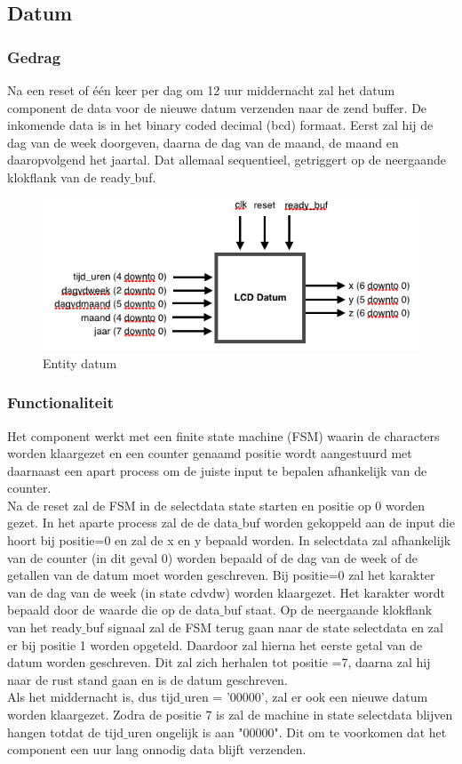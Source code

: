 \subsection{Datum}
\subsubsection{Gedrag}
Na een reset of \'e\'en keer per dag om 12 uur middernacht zal het datum component de data voor de nieuwe datum verzenden naar de zend buffer. De inkomende data is in het binary coded decimal (bcd) formaat. Eerst zal hij de dag van de week doorgeven, daarna de dag van de maand, de maand en daaropvolgend het jaartal. Dat allemaal sequentieel, getriggert op de neergaande klokflank van de ready$\_$buf. 

\begin{figure}
  \centering
     \includegraphics[angle = 0, scale= 0.75]{verslag_schemas/datum_entity.png}
       \caption{Entity datum}
\label{fig:simlayout}
\end{figure}


\subsubsection{Functionaliteit}
Het component werkt met een finite state machine (FSM) waarin de characters worden klaargezet en een counter genaamd positie wordt aangestuurd met daarnaast een apart process om de juiste input te bepalen afhankelijk van de counter. \\
Na de reset zal de FSM in de selectdata state starten en positie op 0 worden gezet. 
In het aparte process zal de de data$\_$buf worden gekoppeld aan de input die hoort bij positie=0 en zal de x en y bepaald worden. 
 In selectdata zal  afhankelijk van de counter (in dit geval 0) worden bepaald of de dag van de week of de getallen van de datum moet worden geschreven. Bij positie=0 zal het karakter van de dag van de week (in state cdvdw) worden klaargezet. Het karakter wordt bepaald door de waarde die op de data$\_$buf staat. Op de neergaande klokflank van het ready$\_$buf signaal zal de FSM terug gaan naar de state selectdata en zal er bij positie 1 worden opgeteld. Daardoor zal hierna het eerste getal van de datum worden geschreven. Dit zal zich herhalen tot positie =7, daarna zal hij naar de rust stand gaan en is de datum geschreven. \\
 Als het middernacht is, dus tijd$\_$uren = '00000', zal er ook een nieuwe datum worden klaargezet. Zodra de positie 7 is zal de machine in state selectdata blijven hangen totdat de tijd$\_$uren ongelijk is aan "00000". Dit om te voorkomen dat het component een uur lang onnodig data blijft verzenden. 



